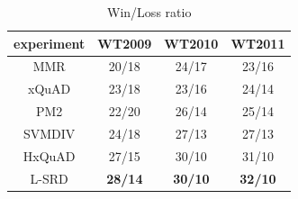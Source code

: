 \documentclass[review]{elsarticle}
\begin{document}
%

\begin{table}[!htb]
\centering
\begin{tabular}{|c|c|c|c|}
\hline
experiment & WT2009         & WT2010         & WT2011         \\
\hline
MMR        & 20/18          & 24/17          & 23/16          \\
xQuAD      & 23/18          & 23/16          & 24/14          \\
PM2        & 22/20          & 26/14          & 25/14          \\
SVMDIV     & 24/18          & 27/13          & 27/13          \\
HxQuAD     & 27/15          &  30/10         & 31/10          \\
L-SRD      & \textbf{28/14} & \textbf{30/10} & \textbf{32/10}  \\
\hline
\end{tabular}
\caption{Win/Loss ratio}
\label{tab3}
\end{table}

\end{document}
